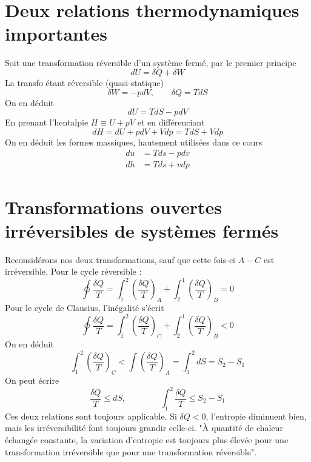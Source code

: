 		\newpage
		
	\section{Deux relations thermodynamiques importantes}
	Soit une transformation réversible d'un système fermé, par le premier principe 
	\begin{equation}
	dU = \delta Q + \delta W
	\end{equation}
	La transfo étant réversible (quasi-statique)
	\begin{equation}
	\delta W = -pdV,\qquad \delta Q = TdS
	\end{equation}
	On en déduit
	\begin{equation}
	dU = TdS - pdV
	\end{equation}
	En prenant l'hentalpie $H \equiv U + pV$ et en différenciant 
	\begin{equation}
	dH = dU + pdV + Vdp = TdS + Vdp
	\end{equation}
	On en déduit les formes massiques, hautement utilisées dans ce cours
	\begin{equation}
	\begin{array}{ll}
	du &= Tds- pdv\\
	dh &= Tds + vdp
	\end{array}
	\end{equation}
	
	\section{Transformations ouvertes irréversibles de systèmes fermés}
	Reconsidérons nos deux transformations, sauf que cette fois-ci $A-C$ est 
	irréversible. Pour le cycle réversible :
	\begin{equation}
	\oint \dfrac{\delta Q}{T} = \int_1^2 \left(\dfrac{\delta Q}{T}\right)_A + 
	\int_2^1 \left(\dfrac{\delta Q}{T}\right)_B = 0
	\end{equation}
	Pour le cycle de Clausius, l'inégalité s'écrit
	\begin{equation}
		\oint \dfrac{\delta Q}{T} = \int_1^2 \left(\dfrac{\delta Q}{T}\right)_C + 
	\int_2^1 \left(\dfrac{\delta Q}{T}\right)_B < 0
	\end{equation}
	On en déduit
	\begin{equation}
	\int_1^2\left(\dfrac{\delta Q}{T}\right)_C < \int \left(\dfrac{\delta Q}{T}
	\right)_A = \int_1^2 dS = S_2-S_1
	\end{equation}
	On peut écrire
	\begin{equation}
	\dfrac{\delta Q}{T} \leq dS,\qquad\qquad \int_1^2 \dfrac{\delta Q}{T} \leq 
	S_2-S_1
	\end{equation}
	Ces deux relations sont toujours applicable. Si $\delta Q <0$, l'entropie 
	diminuent bien, mais les irréversibilité font toujours grandir celle-ci. 
	"À quantité de chaleur échangée constante, la variation d’entropie est 
	toujours plus élevée pour une transformation irréversible que pour une 
	transformation réversible".
	

